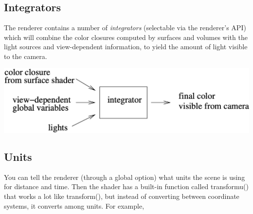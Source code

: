 \documentclass[11pt,letterpaper]{book}
\def\langname{Open Shading Language\xspace}
\begin{document}

\subsection*{Integrators}

The renderer contains a number of \emph{integrators} (selectable via the
renderer's API) which will combine the color closures computed by
surfaces and volumes with the light sources and view-dependent
information, to yield the amount of light visible to the camera.

\bigskip

\includegraphics{Figures/integratorschematic}

\medskip


\subsection*{Units}

You can tell the renderer (through a global option) what units the scene
is using for distance and time.  Then the shader has a built-in function
called {\cf transformu()} that works a lot like {\cf transform()}, but
instead of converting between coordinate systems, it converts among
units.  For example,
\end{document}
